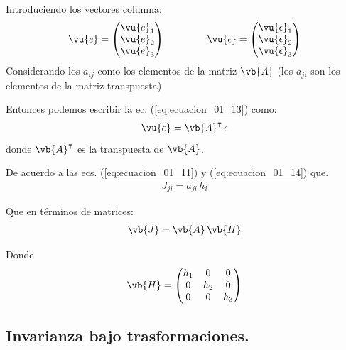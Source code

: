 Introduciendo los vectores columna:
\begin{align*}
\vu{e} =
\begin{pmatrix}
\vu{e}_{1} \\
\vu{e}_{2} \\
\vu{e}_{3} \\
\end{pmatrix}
\hspace{1.5cm}
\vu{\epsilon} =
\begin{pmatrix}
\vu{\epsilon}_{1} \\
\vu{\epsilon}_{2} \\
\vu{\epsilon}_{3} \\
\end{pmatrix}
\end{align*}
 Considerando los $a_{ij}$ como los elementos de la matriz $\vb{A}$ (los $a_{ji}$ son los elementos de la matriz transpuesta)
\par
Entonces podemos escribir la ec. (\ref{eq:ecuacion_01_13}) como:
\begin{align}
\vu{e} = \vb{A}^{\intercal} \, \epsilon
\end{align}
donde $\vb{A}^{\intercal}$ es la transpuesta de $\vb{A}$.
\par
De acuerdo a las ecs. (\ref{eq:ecuacion_01_11}) y (\ref{eq:ecuacion_01_14}) que.
\begin{align*}
J_{ji} = a_{ji} \, h_{i}
\end{align*}
\par
Que en términos de matrices:
\begin{align}
\vb{J} = \vb{A} \, \vb{H}
\label{eq:ecuacion_01_16}
\end{align}
\par
Donde
\begin{align}
\vb{H} = \begin{pmatrix}
h_{1} & 0 & 0 \\
0 & h_{2} & 0 \\
0 & 0 & h_{3} \\
\end{pmatrix}
\label{eq:ecuacion_01_17}
\end{align}

\subsection{Invarianza bajo trasformaciones.}

